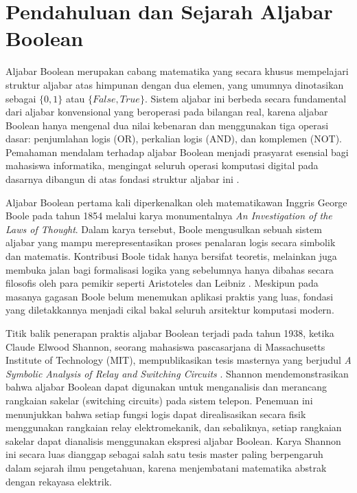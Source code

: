 \section{Pendahuluan dan Sejarah Aljabar Boolean}

Aljabar Boolean merupakan cabang matematika yang secara khusus mempelajari struktur aljabar atas himpunan dengan dua elemen, yang umumnya dinotasikan sebagai $\{0, 1\}$ atau $\{False, True\}$. Sistem aljabar ini berbeda secara fundamental dari aljabar konvensional yang beroperasi pada bilangan real, karena aljabar Boolean hanya mengenal dua nilai kebenaran dan menggunakan tiga operasi dasar: penjumlahan logis (OR), perkalian logis (AND), dan komplemen (NOT). Pemahaman mendalam terhadap aljabar Boolean menjadi prasyarat esensial bagi mahasiswa informatika, mengingat seluruh operasi komputasi digital pada dasarnya dibangun di atas fondasi struktur aljabar ini \cite{rosen2019}.

Aljabar Boolean pertama kali diperkenalkan oleh matematikawan Inggris George Boole pada tahun 1854 melalui karya monumentalnya \textit{An Investigation of the Laws of Thought}. Dalam karya tersebut, Boole mengusulkan sebuah sistem aljabar yang mampu merepresentasikan proses penalaran logis secara simbolik dan matematis. Kontribusi Boole tidak hanya bersifat teoretis, melainkan juga membuka jalan bagi formalisasi logika yang sebelumnya hanya dibahas secara filosofis oleh para pemikir seperti Aristoteles dan Leibniz \cite{wiki_boolean}. Meskipun pada masanya gagasan Boole belum menemukan aplikasi praktis yang luas, fondasi yang diletakkannya menjadi cikal bakal seluruh arsitektur komputasi modern.

Titik balik penerapan praktis aljabar Boolean terjadi pada tahun 1938, ketika Claude Elwood Shannon, seorang mahasiswa pascasarjana di Massachusetts Institute of Technology (MIT), mempublikasikan tesis masternya yang berjudul \textit{A Symbolic Analysis of Relay and Switching Circuits} \cite{shannon1938}. Shannon mendemonstrasikan bahwa aljabar Boolean dapat digunakan untuk menganalisis dan merancang rangkaian sakelar (switching circuits) pada sistem telepon. Penemuan ini menunjukkan bahwa setiap fungsi logis dapat direalisasikan secara fisik menggunakan rangkaian relay elektromekanik, dan sebaliknya, setiap rangkaian sakelar dapat dianalisis menggunakan ekspresi aljabar Boolean. Karya Shannon ini secara luas dianggap sebagai salah satu tesis master paling berpengaruh dalam sejarah ilmu pengetahuan, karena menjembatani matematika abstrak dengan rekayasa elektrik.

